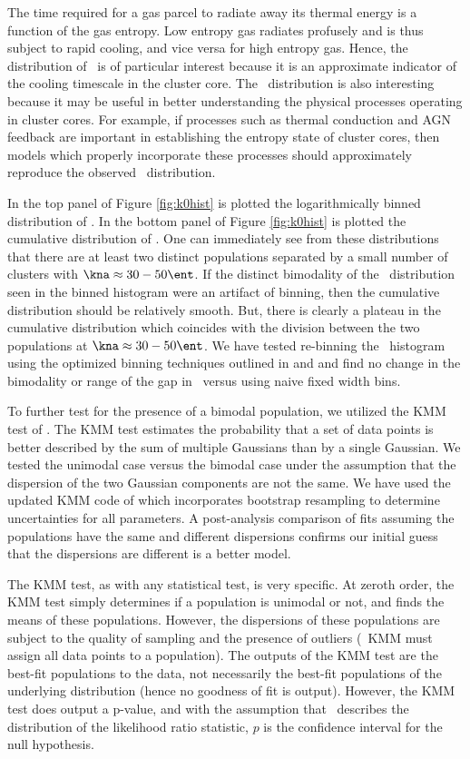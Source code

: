 \documentclass{emulateapj}
\begin{document}
The time required for a gas parcel to radiate away its thermal energy
is a function of the gas entropy. Low entropy gas radiates profusely
and is thus subject to rapid cooling, and vice versa for high entropy
gas. Hence, the distribution of \kna\ is of particular interest
because it is an approximate indicator of the cooling timescale in the
cluster core. The \kna\ distribution is also interesting because it
may be useful in better understanding the physical processes operating
in cluster cores. For example, if processes such as thermal conduction
and AGN feedback are important in establishing the entropy state of
cluster cores, then models which properly incorporate these processes
should approximately reproduce the observed \kna\ distribution.

In the top panel of Figure \ref{fig:k0hist} is plotted the
logarithmically binned distribution of \kna. In the bottom panel of
Figure \ref{fig:k0hist} is plotted the cumulative distribution of
\kna. One can immediately see from these distributions that there are
at least two distinct populations separated by a small number of
clusters with $\kna \approx 30-50 \ent$. If the distinct bimodality of
the \kna\ distribution seen in the binned histogram were an artifact
of binning, then the cumulative distribution should be relatively
smooth. But, there is clearly a plateau in the cumulative distribution
which coincides with the division between the two populations at $\kna
\approx 30-50 \ent$. We have tested re-binning the \kna\ histogram
using the optimized binning techniques outlined in \citet{knuthbin}
and \citet{2008arXiv0807.4820H} and find no change in the bimodality
or range of the gap in \kna\ versus using naive fixed width bins.

To further test for the presence of a bimodal population, we utilized
the KMM test of \citet{kmm1}. The KMM test estimates the probability
that a set of data points is better described by the sum of multiple
Gaussians than by a single Gaussian. We tested the unimodal case
versus the bimodal case under the assumption that the dispersion of
the two Gaussian components are not the same. We have used the updated
KMM code of \citet{kmm2} which incorporates bootstrap resampling to
determine uncertainties for all parameters. A post-analysis comparison
of fits assuming the populations have the same and different
dispersions confirms our initial guess that the dispersions are
different is a better model.

The KMM test, as with any statistical test, is very specific. At
zeroth order, the KMM test simply determines if a population is
unimodal or not, and finds the means of these populations. However,
the dispersions of these populations are subject to the quality of
sampling and the presence of outliers (\eg\ KMM must assign all data
points to a population). The outputs of the KMM test are the best-fit
populations to the data, not necessarily the best-fit populations of
the underlying distribution (hence no goodness of fit is
output). However, the KMM test does output a p-value, and with the
assumption that \chisq\ describes the distribution of the likelihood
ratio statistic, $p$ is the confidence interval for the null
hypothesis.
\end{document}
